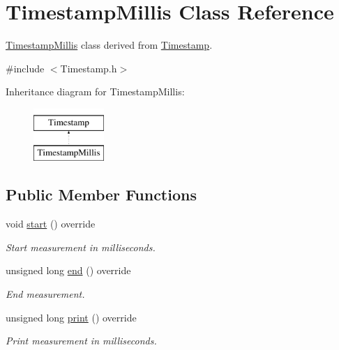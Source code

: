 \hypertarget{class_timestamp_millis}{}\section{Timestamp\+Millis Class Reference}
\label{class_timestamp_millis}


\hyperlink{class_timestamp_millis}{Timestamp\+Millis} class derived from \hyperlink{class_timestamp}{Timestamp}.  




{\ttfamily \#include $<$Timestamp.\+h$>$}

Inheritance diagram for Timestamp\+Millis\+:\begin{figure}[H]
\begin{center}
\leavevmode
\includegraphics[height=2.000000cm]{class_timestamp_millis}
\end{center}
\end{figure}
\subsection*{Public Member Functions}
\begin{DoxyCompactItemize}
\item 
void \hyperlink{class_timestamp_millis_a4865760b8d19a2cff0b230c8bf0123d2}{start} () override\hypertarget{class_timestamp_millis_a4865760b8d19a2cff0b230c8bf0123d2}{}\label{class_timestamp_millis_a4865760b8d19a2cff0b230c8bf0123d2}

\begin{DoxyCompactList}\small\item\em Start measurement in milliseconds. \end{DoxyCompactList}\item 
unsigned long \hyperlink{class_timestamp_millis_ad0bd89a6d30c9ee317dded214dd3084c}{end} () override
\begin{DoxyCompactList}\small\item\em End measurement. \end{DoxyCompactList}\item 
unsigned long \hyperlink{class_timestamp_millis_a4994e32cdd53388cbb550d467ddbd6f9}{print} () override
\begin{DoxyCompactList}\small\item\em Print measurement in milliseconds. \end{DoxyCompactList}\end{DoxyCompactItemize}


